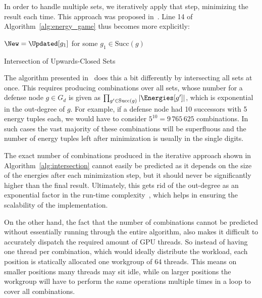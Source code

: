 In order to handle multiple sets, we iteratively apply that step,
minimizing the result each time.
This approach was proposed in~\cite{brihaye2023multi}.
Line 14 of Algorithm~\ref{alg:energy_game} thus becomes more explicitly:

\begin{algorithm}[H]\label{alg:intersection}
    \DontPrintSemicolon

    $\New = \Updated[g_1]$ for some $g_1 \in \mathrm{Succ}(g)$\;

    \caption{Intersection of Upwards-Closed Sets}
\end{algorithm}

The algorithm presented in~\cite{bisping2023process} does this a bit
differently by intersecting all sets at once.
This requires producing combinations over all sets,
whose number for a defense node $g \in G_d$ is given as
$\prod_{g' \in \mathrm{Succ}(g)} |\Energies[g']|$,
which is exponential in the out-degree of $g$.
For example, if a defense node had 10 successors with 5 energy tuples each,
we would have to consider $5^{10} = 9\,765\,625$ combinations.
In such cases the vast majority of these combinations will be superfluous and 
the number of energy tuples left after minimization is usually in the single
digits.

The exact number of combinations produced in the iterative approach shown in
Algorithm~\ref{alg:intersection} cannot easily be predicted as it depends on
the size of the energies after each minimization step,
but it should never be significantly higher than the final result.
Ultimately, this gets rid of the out-degree as an exponential factor in the
run-time complexity~\cite{brihaye2023multi},
which helps in ensuring the scalability of the implementation.

On the other hand, the fact that the number of combinations cannot be predicted
without essentially running through the entire algorithm,
also makes it difficult to accurately dispatch the required amount of GPU
threads.
So instead of having one thread per combination,
which would ideally distribute the workload,
each position is statically allocated one workgroup of 64 threads.
This means on smaller positions many threads may sit idle,
while on larger positions the workgroup will have to perform the same
operations multiple times in a loop to cover all combinations.

